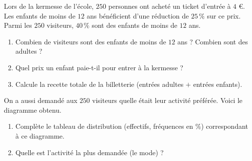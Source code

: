 \documentclass[../../syllabus_1.tex]{subfiles}
\begin{document}
\begin{exercise}
    Lors de la kermesse de l'école, $250$ personnes ont acheté un ticket d'entrée à $4$ €. Les enfants de moins de $12$ ans bénéficient d'une réduction de $25\,\%$ sur ce prix. Parmi les $250$ visiteurs, $40\,\%$ sont des enfants de moins de $12$ ans.
    \begin{enumerate}
        \item Combien de visiteurs sont des enfants de moins de $12$ ans ? Combien sont des adultes ?
        \item Quel prix un enfant paie-t-il pour entrer à la kermesse ?
        \item Calcule la recette totale de la billetterie (entrées adultes $+$ entrées enfants).
    \end{enumerate}
    On a aussi demandé aux $250$ visiteurs quelle était leur activité préférée. Voici le diagramme obtenu.
    \begin{center}
    \end{center}
    \begin{enumerate}[resume]
        \item Complète le tableau de distribution (effectifs, fréquences en \%) correspondant à ce diagramme.
        \item Quelle est l'activité la plus demandée (le mode) ?
    \end{enumerate}

\end{exercise}
\end{document}
